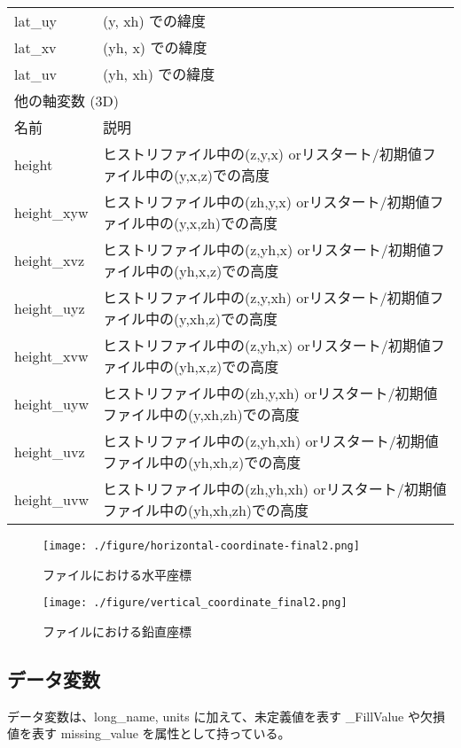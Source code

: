\begin{longtable}{l|l}
lat\_uy & (y, xh) での緯度 \\
lat\_xv & (yh, x) での緯度 \\
lat\_uv & (yh, xh) での緯度 \\
\hline
\multicolumn{2}{l}{他の軸変数 (3D)}\\ \hline
名前 & 説明 \\ \hline \hline
height      & ヒストリファイル中の(z,y,x) orリスタート/初期値ファイル中の(y,x,z)での高度\\
height\_xyw & ヒストリファイル中の(zh,y,x) orリスタート/初期値ファイル中の(y,x,zh)での高度\\
height\_xvz & ヒストリファイル中の(z,yh,x) orリスタート/初期値ファイル中の(yh,x,z)での高度\\
height\_uyz & ヒストリファイル中の(z,y,xh) orリスタート/初期値ファイル中の(y,xh,z)での高度\\
height\_xvw & ヒストリファイル中の(z,yh,x) orリスタート/初期値ファイル中の(yh,x,z)での高度\\
height\_uyw & ヒストリファイル中の(zh,y,xh) orリスタート/初期値ファイル中の(y,xh,zh)での高度\\
height\_uvz & ヒストリファイル中の(z,yh,xh) orリスタート/初期値ファイル中の(yh,xh,z)での高度\\
height\_uvw & ヒストリファイル中の(zh,yh,xh) orリスタート/初期値ファイル中の(yh,xh,zh)での高度\\
\end{longtable}

\begin{figure}[tbh]
\begin{center}
  \texttt{[image: ./figure/horizontal-coordinate-final2.png]}\\
  \caption{{\scalenetcdf}ファイルにおける水平座標}
  \label{fig:netcdfhorizontalcoordinate}
\end{center}
\end{figure}
\begin{figure}[tbh]
\begin{center}
  \texttt{[image: ./figure/vertical\_coordinate\_final2.png]}\\
  \caption{{\scalenetcdf}ファイルにおける鉛直座標}
  \label{fig:netcdfverticalcoordinate}
\end{center}
\end{figure}

\subsection{データ変数}
データ変数は、long\_name, units に加えて、未定義値を表す \_FillValue や欠損値を表す missing\_value を属性として持っている。

